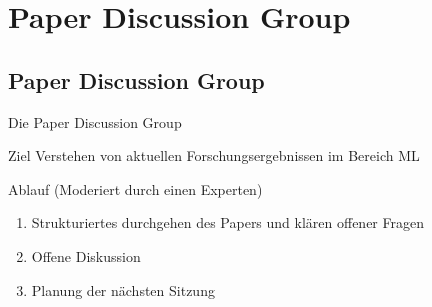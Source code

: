 \section{Paper Discussion Group}
\subsection*{Paper Discussion Group}

\begin{frame}{Die Paper Discussion Group}
    \begin{block}{Ziel}
		Verstehen von aktuellen Forschungsergebnissen im Bereich ML
    \end{block}
    
    \pause
    
    \begin{block}{Ablauf (Moderiert durch einen Experten)}
    \begin{enumerate}
    \item Strukturiertes durchgehen des Papers und klären offener Fragen 
    \item Offene Diskussion
    \item Planung der nächsten Sitzung
    \end{enumerate}
    \end{block}
    
    \pause
    
    \vspace{.25cm}
    
\end{frame}

